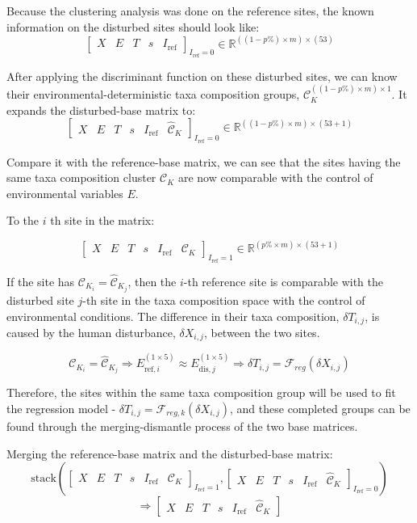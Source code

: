 Because the clustering analysis was done on the reference sites, the known information on the disturbed sites should look like:
\[
\left[
\begin{array}{ccccc}
X & E & T & s & I_{\text{ref}}
\end{array}
\right]_{I_{\text{ref}} = 0}
\in
\mathbb{R}^{((1 - p\%) \times m) \times (53)}
\]

After applying the discriminant function on these disturbed sites, 
we can know their environmental-deterministic taxa composition groups,
\(\mathcal{C}_K^{((1 - p\%) \times m) \times 1}\).
It expands the disturbed-base matrix to:
\[\left[
\begin{array}{cccccc}
X & E & T & s & I_{\text{ref}} & \mathcal{\hat C}_K
\end{array}
\right]_{I_{\text{ref}} = 0}
\in
\mathbb{R}^{((1 - p\%) \times m) \times (53 + 1)}
\]

Compare it with the reference-base matrix,
we can see that the sites having the same taxa composition cluster \(\mathcal{C}_K\) are now comparable 
with the control of environmental variables \(E\).

To the \(i\) th site in the matrix:

\[\left[
\begin{array}{cccccc}
X & E & T & s & I_{\text{ref}} & \mathcal{C}_K
\end{array}
\right]_{I_{\text{ref}} = 1}
\in
\mathbb{R}^{(p\% \times m) \times (53 + 1)}
\]

If the site has \(\mathcal{C}_{K_i} = \mathcal{\hat C}_{K_j}\), then the \(i\)-th reference site is comparable with the disturbed site \(j\)-th site in the taxa composition space with the control of environmental conditions.
The difference in their taxa composition, \(\delta T_{i,j}\), is caused by the human disturbance, \(\delta X_{i,j}\), between the two sites.

\[
\mathcal{C}_{K_i} = \mathcal{\hat C}_{K_j} \Rightarrow E_{\text{ref}, i}^{(1 \times 5)} \approx E_{\text{dis}, j}^{(1 \times 5)} \Rightarrow \delta T_{i,j} = \mathcal{F}_{reg}(\delta X_{i,j})
\]

Therefore, the sites within the same taxa composition group will be used to fit the regression model - \(\delta T_{i,j} = \mathcal{F}_{reg, k}(\delta X_{i,j})\), 
and these completed groups can be found through
the merging-dismantle process of the two base matrices.

Merging the reference-base matrix and the disturbed-base matrix:
\[
\text{stack}\left(
\left[
\begin{array}{cccccc}
X & E & T & s & I_{\text{ref}} & \mathcal{C}_K
\end{array}
\right]_{I_{\text{ref}} = 1}
,
\left[
\begin{array}{cccccc}
X & E & T & s & I_{\text{ref}} & \mathcal{\hat C}_K
\end{array}
\right]_{I_{\text{ref}} = 0}
\right)
\]
\[
\Rightarrow
\left[
\begin{array}{cccccc}
X & E & T & s & I_{\text{ref}} & \mathcal{\hat C}_K
\end{array}
\right]
\]

